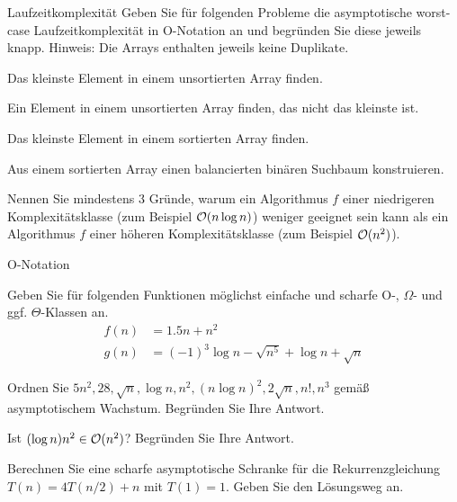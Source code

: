 \documentclass{exercisesheet}
\begin{document}
\begin{eexercises}{Laufzeitkomplexität}{
    Geben Sie für folgenden Probleme die asymptotische worst-case Laufzeitkomplexität in O-Notation an und begründen Sie diese jeweils knapp. Hinweis: Die Arrays enthalten jeweils keine Duplikate.
  }
  \item Das kleinste Element in einem unsortierten Array finden.
  \item Ein Element in einem unsortierten Array finden, das nicht das kleinste ist.
  \item Das kleinste Element in einem sortierten Array finden.
  \item Aus einem sortierten Array einen balancierten binären Suchbaum konstruieren.
  \item Nennen Sie mindestens 3 Gründe, warum ein Algorithmus $f$ einer niedrigeren Komplexitätsklasse (zum Beispiel $\mathcal{O}(n \log n)$) weniger geeignet sein kann als ein Algorithmus $f$ einer höheren Komplexitätsklasse (zum Beispiel $\mathcal{O}(n^2)$).
\end{eexercises}

\begin{exercises}{O-Notation}
\item Geben Sie für folgenden Funktionen möglichst einfache und scharfe O-, $\Omega$- und ggf. $\Theta$-Klassen an.
\begin{align*}
  f(n) & = 1.5n + n^2                                     \\
  g(n) & = (-1)^3 \log n - \sqrt{n^5} + \log n + \sqrt{n}
\end{align*}
\item Ordnen Sie $5n^2, 28, \sqrt{n}, \log n, n^2, (n \log n)^2, 2\sqrt{n}, n!, n^3$ gemäß asymptotischem Wachstum. Begründen Sie Ihre Antwort.
\item Ist $(\log n)n^2 \in \mathcal{O}(n^2)$? Begründen Sie Ihre Antwort.
\item Berechnen Sie eine scharfe asymptotische Schranke für die Rekurrenzgleichung $T(n) = 4T(n/2) + n$ mit $T(1) = 1$. Geben Sie den Lösungsweg an.
\end{exercises}
\end{document}

